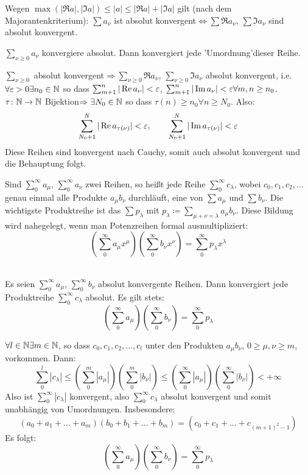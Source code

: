 Wegen $ \max(|\Re a|,|\Im a|)\leq |a|\leq|\Re a|+|\Im a| $ gilt (nach dem Majorantenkriterium): $ \sum a_\nu $ ist absolut konvergent$ \Leftrightarrow\sum \Re a_\nu $, $ \sum\Im a_\nu $ sind absolut konvergent.\\
\begin{satz}[Umordnungssatz]
$ \sum_{\nu\geq 0} a_\nu$ konvergiere absolut. Dann konvergiert jede 'Umordnung'\footnotemark[2] dieser Reihe.
\end{satz}
\begin{beweis}
$ \sum_{\nu\geq 0} $ absolut konvergent$ \Rightarrow \sum_{\nu\geq 0}\Re a_\nu$, $ \sum_{\nu\geq 0} \Im a_\nu $ absolut konvergent, i.e. $ \forall\varepsilon>0\exists n_0\in\mathbb{N} $ so dass $ \sum_{m+1}^{n}|\operatorname{Re} a_\nu|<\varepsilon $, $ \sum_{m+1}^{n} |\operatorname{Im} a_\nu|<\varepsilon\forall m,n\geq n_0 $. $ \tau\colon\mathbb{N}\rightarrow\mathbb{N} $ Bijektion$ \Rightarrow\exists N_0\in\mathbb{N} $ so dass $ \tau(n)\geq n_0\forall n\geq N_0 $. Also: 
\[ \sum_{N_0+1}^{N} |\operatorname{Re} a_{\tau(\nu)}|<\varepsilon,\qquad\sum_{N_0+1}^{N}|\operatorname{Im} a_{\tau(\nu)}|<\varepsilon \]
Diese Reihen sind konvergent nach Cauchy, somit auch absolut konvergent und die Behauptung folgt.
\end{beweis}
Sind $ \sum_{0}^{\infty} a_\mu $, $ \sum_{0}^{\infty}a_\nu $ zwei Reihen, so hei\ss t jede Reihe $ \sum_{0}^{\infty}c_\lambda $, wobei $ c_0,c_1,c_2,... $ genau einmal alle Produkte $ a_\mu b_\nu $ durchl\"auft, eine  von $ \sum a_\mu $ und $ \sum b_\nu $. Die wichtigste Produktreihe ist das  $ \sum p_\lambda $ mit $ p_\lambda\coloneqq\sum_{\mu+\nu=\lambda} a_\mu b_\nu $. Diese Bildung wird nahegelegt, wenn man Potenzreihen formal ausmultipliziert:
\[ \left(\sum_{0}^{\infty} a_\mu x^\mu\right)\left(\sum_{0}^{\infty} b_\nu x^\nu\right)=\sum_{0}^{\infty}p_\lambda x^\lambda \]\\
\begin{satz}[Reihenproduktsatz]
Es seien $ \sum_{0}^{\infty} a_\mu $, $ \sum_{0}^{\infty} b_\nu $ absolut konvergente Reihen. Dann konvergiert jede Produktreihe $ \sum_{0}^{\infty} c_\lambda $ absolut. Es gilt stets:
\[ \left(\sum_{0}^{\infty} a_\mu\right)\left(\sum_{0}^{\infty} b_\nu \right)=\sum_{0}^{\infty}p_\lambda \]
\end{satz}
\begin{beweis}
$ \forall l\in\mathbb{N}\exists m\in\mathbb{N} $, so dass $ c_0,c_1,c_2,...,c_l $ unter den Produkten $ a_\mu b_\nu $, $ 0\geq \mu,\nu\geq m $, vorkommen. Dann:
\[ \sum_{0}^{l}|c_\lambda|\leq\left(\sum_{0}^{m}|a_\mu|\right)\left(\sum_{0}^{m}|b_\nu|\right)\leq\left(\sum_{0}^{\infty}|a_\mu|\right)\left(\sum_{0}^{\infty}|b_\nu|\right)<+\infty \]
Also ist $ \sum_0^\infty|c_\lambda| $ konvergent, also $ \sum_0^\infty c_\lambda $ absolut konvergent und somit unabh\"angig von Umordnungen. Insbesondere:
\[ (a_0+a_1+...+a_m)(b_0+b_1+...+b_m)=(c_0+c_1+...+c_{(m+1)^2-1}) \]
Es folgt:
\[ \left(\sum_{0}^{\infty} a_\mu\right)\left(\sum_{0}^{\infty} b_\nu \right)=\sum_{0}^{\infty}p_\lambda \]
\end{beweis}
